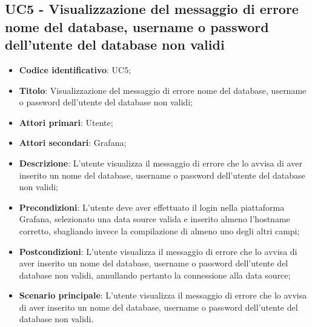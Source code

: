 \subsection{UC5 - Visualizzazione del messaggio di errore nome del database, username o password dell'utente del database non validi}
\begin{itemize}
    \item \textbf{Codice identificativo}: UC5;
    \item \textbf{Titolo}: Visualizzazione del messaggio di errore nome del database, username o password dell'utente del database non validi;
    \item \textbf{Attori primari}: Utente;
    \item \textbf{Attori secondari}: Grafana\glo;
    \item \textbf{Descrizione}: L'utente visualizza il messaggio di errore che lo avvisa di aver inserito un nome del database, username o password dell'utente                                       del database non validi;
    \item \textbf{Precondizioni}: L'utente deve aver effettuato il login nella piattaforma Grafana\glo, selezionato una data source valida e inserito almeno l'hostname                                 corretto, sbagliando invece la compilazione di almeno uno degli altri campi;
    \item \textbf{Postcondizioni}: L'utente visualizza il messaggio di errore che lo avvisa di aver inserito un nome del database, username o password dell'utente del                                   database non validi, annullando pertanto la connessione alla data source;
    \item \textbf{Scenario principale}: L'utente visualizza il messaggio di errore che lo avvisa di aver inserito un nome del database, username o password dell'utente                                       del database non validi.
\end{itemize}